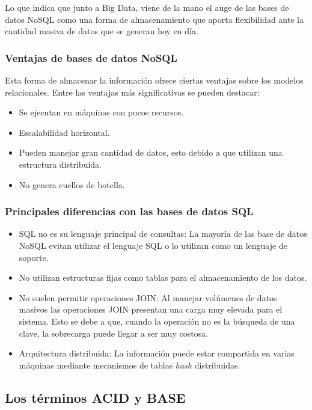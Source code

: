 Lo que indica que junto a Big Data, viene de la mano el auge de las bases de datos NoSQL como una forma de almacenamiento que aporta flexibilidad ante la cantidad masiva de datos que se generan hoy en día.


\subsubsection{Ventajas de bases de datos NoSQL} 
Esta forma de almacenar la información ofrece ciertas ventajas sobre los modelos relacionales. Entre las ventajas más significativas se pueden destacar:
\begin{itemize}
\item Se ejecutan en máquinas con pocos recursos.\cite{11-josemy}
\item Escalabilidad horizontal. \cite{11-josemy}
\item  Pueden manejar gran cantidad de datos, esto debido a que utilizan una estructura
distribuida.\cite{11-josemy}
\item  No genera cuellos de botella. \cite{11-josemy}
\end{itemize}
 

\subsubsection{Principales diferencias con las bases de datos SQL}
\begin{itemize}
\item  SQL no es su lenguaje principal de consultas: La mayoría de las base de datos NoSQL evitan utilizar el lenguaje SQL o lo utilizan como un lenguaje de soporte.\cite{11-josemy}
\item No utilizan estructuras fijas como tablas para el almacenamiento de los datos.\cite{11-josemy}
\item No suelen permitir operaciones JOIN: Al manejar volúmenes de datos masivos las operaciones JOIN presentan una carga muy elevada para el sistema. Esto se debe a que, cuando la operación no es la búsqueda de una clave, la sobrecarga puede llegar a ser muy costosa.\cite{11-josemy}
\item Arquitectura distribuida: La información puede estar compartida en varias máquinas mediante mecanismos de tablas \emph{hash} distribuidas. \cite{11-josemy}
\end{itemize}

\subsection{Los términos ACID y BASE}


